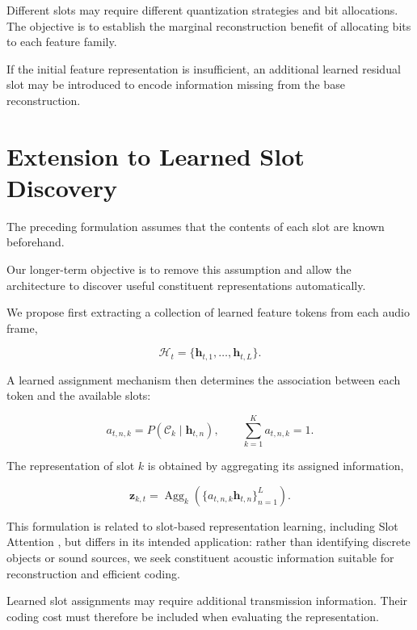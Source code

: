 \documentclass{article}
\begin{document}
Different slots may require different quantization
strategies and bit allocations. The objective is
to establish the marginal reconstruction benefit
of allocating bits to each feature family.

If the initial feature representation is insufficient,
an additional learned residual slot may be introduced
to encode information missing from the base reconstruction.

\section{Extension to Learned Slot Discovery}

The preceding formulation assumes that the contents
of each slot are known beforehand.

Our longer-term objective is to remove this assumption
and allow the architecture to discover useful
constituent representations automatically.

We propose first extracting a collection of learned
feature tokens from each audio frame,

\begin{equation}
    \mathcal{H}_t
    =
    \{\mathbf{h}_{t,1},\ldots,\mathbf{h}_{t,L}\}.
\end{equation}

A learned assignment mechanism then determines
the association between each token and the available
slots:

\begin{equation}
    \boxed{
    a_{t,n,k}
    =
    P(\mathcal{C}_k\mid\mathbf{h}_{t,n}),
    \qquad
    \sum_{k=1}^{K}a_{t,n,k}=1.
    }
\end{equation}

The representation of slot $k$ is obtained by
aggregating its assigned information,

\begin{equation}
    \mathbf{z}_{k,t}
    =
    \operatorname{Agg}_k
    \left(
    \{a_{t,n,k}\mathbf{h}_{t,n}\}_{n=1}^{L}
    \right).
\end{equation}

This formulation is related to slot-based
representation learning, including Slot Attention
\cite{slotattention}, but differs in its intended
application: rather than identifying discrete
objects or sound sources, we seek constituent
acoustic information suitable for reconstruction
and efficient coding.

Learned slot assignments may require additional
transmission information. Their coding cost must
therefore be included when evaluating the representation.
\end{document}
